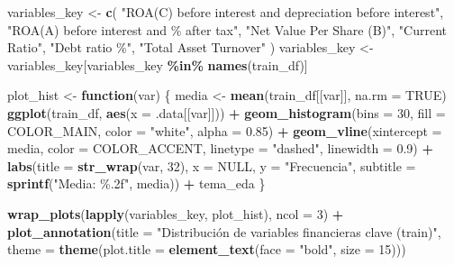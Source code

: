 \documentclass[
]{book}
\newenvironment{Shaded}{\begin{snugshade}}{\end{snugshade}}
\newcommand{\AttributeTok}[1]{\textcolor[rgb]{0.13,0.29,0.53}{#1}}
\newcommand{\ConstantTok}[1]{\textcolor[rgb]{0.56,0.35,0.01}{#1}}
\newcommand{\ControlFlowTok}[1]{\textcolor[rgb]{0.13,0.29,0.53}{\textbf{#1}}}
\newcommand{\DecValTok}[1]{\textcolor[rgb]{0.00,0.00,0.81}{#1}}
\newcommand{\FloatTok}[1]{\textcolor[rgb]{0.00,0.00,0.81}{#1}}
\newcommand{\FunctionTok}[1]{\textcolor[rgb]{0.13,0.29,0.53}{\textbf{#1}}}
\newcommand{\NormalTok}[1]{#1}
\newcommand{\OtherTok}[1]{\textcolor[rgb]{0.56,0.35,0.01}{#1}}
\newcommand{\SpecialCharTok}[1]{\textcolor[rgb]{0.81,0.36,0.00}{\textbf{#1}}}
\newcommand{\StringTok}[1]{\textcolor[rgb]{0.31,0.60,0.02}{#1}}
\begin{document}
\begin{Shaded}
\begin{Highlighting}[]
\NormalTok{variables\_key }\OtherTok{\textless{}{-}} \FunctionTok{c}\NormalTok{(}
  \StringTok{"ROA(C) before interest and depreciation before interest"}\NormalTok{,}
  \StringTok{"ROA(A) before interest and \% after tax"}\NormalTok{,}
  \StringTok{"Net Value Per Share (B)"}\NormalTok{,}
  \StringTok{"Current Ratio"}\NormalTok{,}
  \StringTok{"Debt ratio \%"}\NormalTok{,}
  \StringTok{"Total Asset Turnover"}
\NormalTok{)}
\NormalTok{variables\_key }\OtherTok{\textless{}{-}}\NormalTok{ variables\_key[variables\_key }\SpecialCharTok{\%in\%} \FunctionTok{names}\NormalTok{(train\_df)]}

\NormalTok{plot\_hist }\OtherTok{\textless{}{-}} \ControlFlowTok{function}\NormalTok{(var) \{}
\NormalTok{  media }\OtherTok{\textless{}{-}} \FunctionTok{mean}\NormalTok{(train\_df[[var]], }\AttributeTok{na.rm =} \ConstantTok{TRUE}\NormalTok{)}
  \FunctionTok{ggplot}\NormalTok{(train\_df, }\FunctionTok{aes}\NormalTok{(}\AttributeTok{x =}\NormalTok{ .data[[var]])) }\SpecialCharTok{+}
    \FunctionTok{geom\_histogram}\NormalTok{(}\AttributeTok{bins =} \DecValTok{30}\NormalTok{, }\AttributeTok{fill =}\NormalTok{ COLOR\_MAIN, }\AttributeTok{color =} \StringTok{"white"}\NormalTok{, }\AttributeTok{alpha =} \FloatTok{0.85}\NormalTok{) }\SpecialCharTok{+}
    \FunctionTok{geom\_vline}\NormalTok{(}\AttributeTok{xintercept =}\NormalTok{ media, }\AttributeTok{color =}\NormalTok{ COLOR\_ACCENT, }\AttributeTok{linetype =} \StringTok{"dashed"}\NormalTok{,}
               \AttributeTok{linewidth =} \FloatTok{0.9}\NormalTok{) }\SpecialCharTok{+}
    \FunctionTok{labs}\NormalTok{(}\AttributeTok{title =} \FunctionTok{str\_wrap}\NormalTok{(var, }\DecValTok{32}\NormalTok{), }\AttributeTok{x =} \ConstantTok{NULL}\NormalTok{,}
         \AttributeTok{y =} \StringTok{"Frecuencia"}\NormalTok{, }\AttributeTok{subtitle =} \FunctionTok{sprintf}\NormalTok{(}\StringTok{"Media: \%.2f"}\NormalTok{, media)) }\SpecialCharTok{+}
\NormalTok{    tema\_eda}
\NormalTok{\}}

\FunctionTok{wrap\_plots}\NormalTok{(}\FunctionTok{lapply}\NormalTok{(variables\_key, plot\_hist), }\AttributeTok{ncol =} \DecValTok{3}\NormalTok{) }\SpecialCharTok{+}
  \FunctionTok{plot\_annotation}\NormalTok{(}\AttributeTok{title =} \StringTok{"Distribución de variables financieras clave (train)"}\NormalTok{,}
                   \AttributeTok{theme =} \FunctionTok{theme}\NormalTok{(}\AttributeTok{plot.title =} \FunctionTok{element\_text}\NormalTok{(}\AttributeTok{face =} \StringTok{"bold"}\NormalTok{, }\AttributeTok{size =} \DecValTok{15}\NormalTok{)))}
\end{Highlighting}
\end{Shaded}
\end{document}
